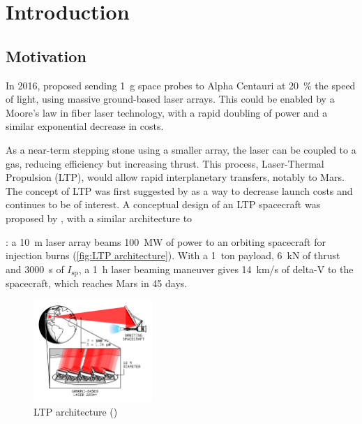 \chapter{Introduction} \label{chp:intro}
    
    \section{Motivation}

        In 2016, \textcite{lubinRoadmapInterstellarFlight2016} proposed sending \qty{1}{g} space probes to Alpha Centauri at \qty{20}{\%} the speed of light, using massive ground-based laser arrays. This could be enabled by a Moore's law in fiber laser technology, with a rapid doubling of power and a similar exponential decrease in costs.
        
        As a near-term stepping stone using a smaller array, the laser can be coupled to a gas, reducing efficiency but increasing thrust. This process, Laser-Thermal Propulsion (LTP), would allow rapid interplanetary transfers, notably to Mars. The concept of LTP was first suggested by \textcite{kantrowitzRelevanceSpace1971} as a way to decrease launch costs and continues to be of interest. A conceptual design of an LTP spacecraft was proposed by \textcite{duplayDesignRapidTransit2022a}, with a similar architecture to \author{lubinRoadmapInterstellarFlight2016}: a \qty{10}{m} laser array beams \qty{100}{MW} of power to an orbiting spacecraft for injection burns (\autoref{fig:LTP architecture}). With a \qty{1}{ton} payload, \qty{6}{kN} of thrust and \qty{3000}{s} of $I_\mathrm{sp}$, a \qty{1}{h} laser beaming maneuver gives \qty{14}{km/s} of delta-V to the spacecraft, which reaches Mars in 45 days.

        \begin{figure}[!ht]
            \centering
            \includegraphics[width=0.4\textwidth]{assets/2 background/ltp_architecture.pdf}
            \caption{LTP architecture (\textcite{duplayArgonLaserPlasmaThruster2024a})}
            \label{fig:LTP architecture}
        \end{figure}

